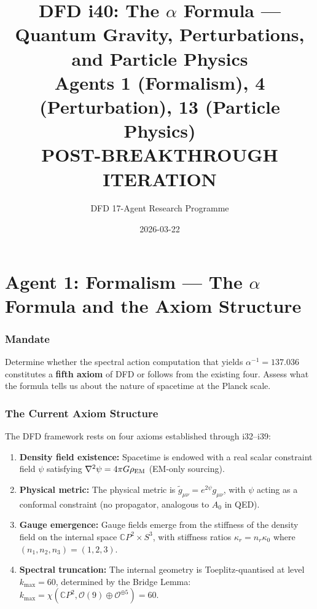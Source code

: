 \documentclass[11pt,a4paper]{article}
\title{DFD i40: The $\alpha$ Formula --- Quantum Gravity, Perturbations, and Particle Physics\\[6pt]
\large Agents 1 (Formalism), 4 (Perturbation), 13 (Particle Physics)\\[6pt]
\normalsize POST-BREAKTHROUGH ITERATION}
\author{DFD 17-Agent Research Programme}
\date{2026-03-22}
\newcommand{\CP}{\mathbb{C}P}
\begin{document}
\maketitle
\tableofcontents
\newpage

\part{Agent 1: Formalism --- The $\alpha$ Formula and the Axiom Structure}
\label{part:agent1}

\section{Mandate}
Determine whether the spectral action computation that yields $\alpha^{-1} = 137.036$ constitutes a \textbf{fifth axiom} of DFD or follows from the existing four. Assess what the formula tells us about the nature of spacetime at the Planck scale.

\section{The Current Axiom Structure}

The DFD framework rests on four axioms established through i32--i39:

\begin{enumerate}
\item[\textbf{A1.}] \textbf{Density field existence:} Spacetime is endowed with a real scalar constraint field $\psi$ satisfying $\nabla^2\psi = 4\pi G\rho_{\rm EM}$ (EM-only sourcing).
\item[\textbf{A2.}] \textbf{Physical metric:} The physical metric is $\tilde{g}_{\mu\nu} = e^{2\psi}g_{\mu\nu}$, with $\psi$ acting as a conformal constraint (no propagator, analogous to $A_0$ in QED).
\item[\textbf{A3.}] \textbf{Gauge emergence:} Gauge fields emerge from the stiffness of the density field on the internal space $\CP^2 \times S^3$, with stiffness ratios $\kappa_r = n_r\kappa_0$ where $(n_1, n_2, n_3) = (1, 2, 3)$.
\item[\textbf{A4.}] \textbf{Spectral truncation:} The internal geometry is Toeplitz-quantised at level $k_{\max} = 60$, determined by the Bridge Lemma: $k_{\max} = \chi(\CP^2, \mathcal{O}(9) \oplus \mathcal{O}^{\oplus 5}) = 60$.
\end{enumerate}
\end{document}
